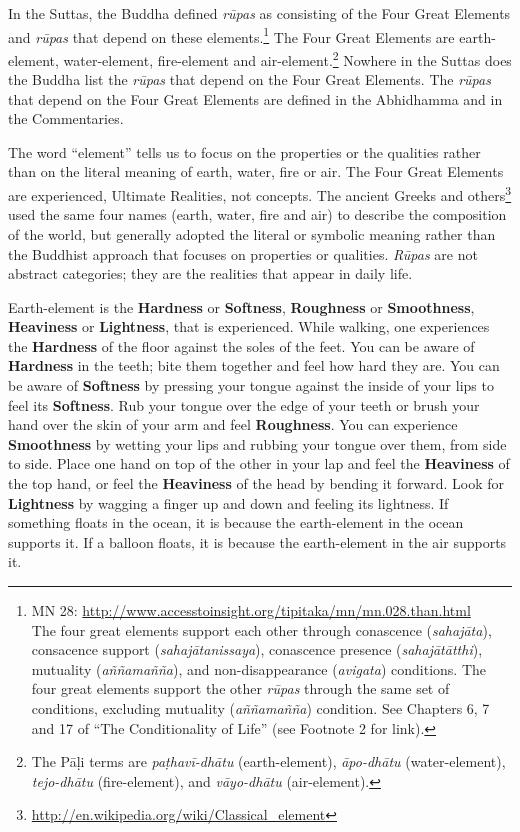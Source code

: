In the Suttas, the Buddha defined \textit{rūpas} as consisting of the Four Great Elements and \textit{rūpas} that depend on these elements.\footnote{MN 28: \url{http://www.accesstoinsight.org/tipitaka/mn/mn.028.than.html}\\ The four great elements support each other through conascence (\textit{sahajāta}), consacence support (\textit{sahajātanissaya}), conascence presence (\textit{sahajātātthi}), mutuality (\textit{\textit{aññamañña}}), and non-disappearance (\textit{avigata}) conditions. The four great elements support the other \textit{rūpas} through the same set of conditions, excluding mutuality (\textit{\textit{aññamañña}}) condition. See Chapters 6, 7 and 17 of “The Conditionality of Life” (see Footnote 2 for link).} The Four Great Elements are earth-element, water-element, fire-element and air-element.\footnote{The Pāḷi terms are \textit{paṭhavī-dhātu} (earth-element), \textit{āpo-dhātu} (water-element), \textit{tejo-dhātu} (fire-element), and \textit{vāyo-dhātu} (air-element).} Nowhere in the Suttas does the Buddha list the \textit{rūpas} that depend on the Four Great Elements. The \textit{rūpas} that depend on the Four Great Elements are defined in the Abhidhamma and in the Commentaries.

The word “element” tells us to focus on the properties or the qualities rather than on the literal meaning of earth, water, fire or air. The Four Great Elements are experienced, Ultimate Realities, not concepts. The ancient Greeks and others\footnote{\url{http://en.wikipedia.org/wiki/Classical_element}} used the same four names (earth, water, fire and air) to describe the composition of the world, but generally adopted the literal or symbolic meaning rather than the Buddhist approach that focuses on properties or qualities. \textit{Rūpas} are not abstract categories; they are the realities that appear in daily life.

\pagebreak

Earth-element is the \textbf{Hardness} or \textbf{Softness}, \textbf{Roughness} or \textbf{Smoothness}, \textbf{Heaviness} or \textbf{Lightness}, that is experienced. While walking, one experiences the \textbf{Hardness} of the floor against the soles of the feet. You can be aware of \textbf{Hardness} in the teeth; bite them together and feel how hard they are. You can be aware of \textbf{Softness} by pressing your tongue against the inside of your lips to feel its \textbf{Softness}. Rub your tongue over the edge of your teeth or brush your hand over the skin of your arm and feel \textbf{Roughness}. You can experience \textbf{Smoothness} by wetting your lips and rubbing your tongue over them, from side to side. Place one hand on top of the other in your lap and feel the \textbf{Heaviness} of the top hand, or feel the \textbf{Heaviness} of the head by bending it forward. Look for \textbf{Lightness} by wagging a finger up and down and feeling its lightness. If something floats in the ocean, it is because the earth-element in the ocean supports it. If a balloon floats, it is because the earth-element in the air supports it.

